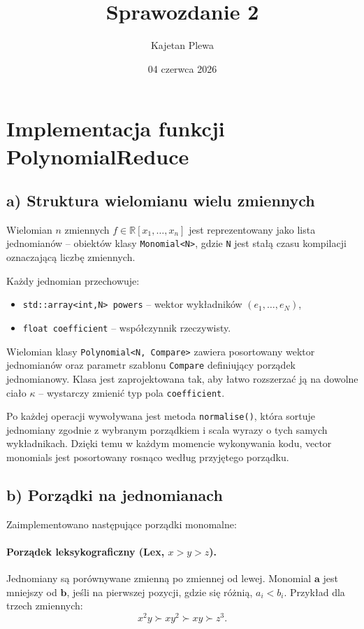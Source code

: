 \documentclass[12pt,a4paper]{article}
\title{Sprawozdanie 2}
\author{Kajetan Plewa}
\date{04 czerwca 2026}
\begin{document}
	
	\maketitle
	
	\section{Implementacja funkcji PolynomialReduce}
	
	\subsection{a) Struktura wielomianu wielu zmiennych}
	
	Wielomian $n$ zmiennych $f \in \mathbb{R}[x_1,\ldots,x_n]$ jest reprezentowany jako lista
	jednomianów -- obiektów klasy \texttt{Monomial<N>}, gdzie \texttt{N} jest stałą czasu
	kompilacji oznaczającą liczbę zmiennych.
	
	Każdy jednomian przechowuje:
	\begin{itemize}
		\item \texttt{std::array<int,N> powers} -- wektor wykładników $(e_1,\ldots,e_N)$,
		\item \texttt{float coefficient} -- współczynnik rzeczywisty.
	\end{itemize}
	
	Wielomian klasy \texttt{Polynomial<N, Compare>} zawiera posortowany wektor jednomianów
	oraz parametr szablonu \texttt{Compare} definiujący porządek jednomianowy.
	Klasa jest zaprojektowana tak, aby łatwo rozszerzać ją na dowolne ciało $\kappa$ -- wystarczy
	zmienić typ pola \texttt{coefficient}.
	
	Po każdej operacji wywoływana jest metoda \texttt{normalise()}, która sortuje jednomiany
	zgodnie z wybranym porządkiem i scala wyrazy o tych samych wykładnikach. Dzięki temu w każdym momencie wykonywania kodu, vector monomials jest posortowany rosnąco według przyjętego porządku.
	
	\subsection{b) Porządki na jednomianach}
	
	Zaimplementowano następujące porządki monomalne:
	
	\paragraph{Porządek leksykograficzny (Lex, $x > y > z$).}
	Jednomiany są porównywane zmienną po zmiennej od lewej.
	Monomial $\mathbf{a}$ jest mniejszy od $\mathbf{b}$, jeśli na pierwszej pozycji, gdzie się różnią,
	$a_i < b_i$.
	Przykład dla trzech zmiennych:
	\[
	x^2 y \succ x y^2 \succ x y \succ z^3.
	\]
	
\end{document}
